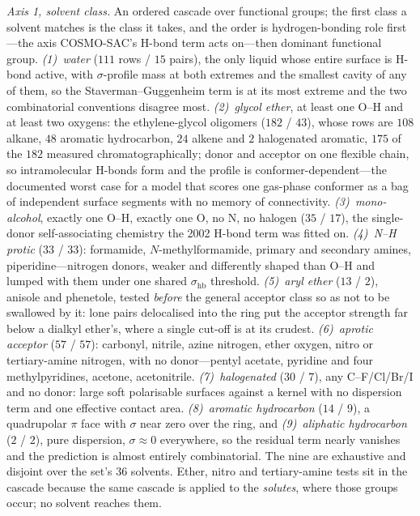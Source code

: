 \emph{Axis 1, solvent class.} An ordered cascade over functional groups; the first class a solvent
matches is the class it takes, and the order is hydrogen-bonding role first---the axis COSMO-SAC's
H-bond term acts on---then dominant functional group. \emph{(1)~water} ($111$ rows / $15$ pairs), the
only liquid whose entire surface is H-bond active, with $\sigma$-profile mass at both extremes and
the smallest cavity of any of them, so the Staverman--Guggenheim term is at its most extreme and the
two combinatorial conventions disagree most. \emph{(2)~glycol ether}, at least one O--H and at least
two oxygens: the ethylene-glycol oligomers ($182$ / $43$), whose rows are $108$ alkane, $48$
aromatic hydrocarbon, $24$ alkene and $2$ halogenated aromatic, $175$ of the $182$ measured
chromatographically; donor and acceptor on one flexible chain,
so intramolecular H-bonds form and the profile is conformer-dependent---the documented worst case for
a model that scores one gas-phase conformer as a bag of independent surface segments with no memory
of connectivity. \emph{(3)~mono-alcohol}, exactly one O--H, exactly one O, no N, no halogen ($35$ /
$17$), the single-donor self-associating chemistry the 2002 H-bond term was fitted on.
\emph{(4)~N--H protic} ($33$ / $33$): formamide, $N$-methylformamide, primary and secondary amines,
piperidine---nitrogen donors, weaker and differently shaped than O--H and lumped with them under one
shared $\sigma_{\mathrm{hb}}$ threshold. \emph{(5)~aryl ether} ($13$ / $2$), anisole and phenetole,
tested \emph{before} the general acceptor class so as not to be swallowed by it: lone pairs
delocalised into the ring put the acceptor strength far below a dialkyl ether's, where a single
cut-off is at its crudest. \emph{(6)~aprotic acceptor} ($57$ / $57$): carbonyl, nitrile, azine
nitrogen, ether oxygen, nitro or tertiary-amine nitrogen, with no donor---pentyl acetate, pyridine
and four methylpyridines, acetone, acetonitrile. \emph{(7)~halogenated} ($30$ / $7$), any
C--F/Cl/Br/I and no donor: large soft polarisable surfaces against a kernel with no dispersion term
and one effective contact area. \emph{(8)~aromatic hydrocarbon} ($14$ / $9$), a quadrupolar $\pi$
face with $\sigma$ near zero over the ring, and \emph{(9)~aliphatic hydrocarbon} ($2$ / $2$), pure
dispersion, $\sigma\approx0$ everywhere, so the residual term nearly vanishes and the prediction is
almost entirely combinatorial. The nine are exhaustive and disjoint over the set's $36$
solvents. Ether, nitro and tertiary-amine tests sit in the cascade because the same cascade is
applied to the \emph{solutes}, where those groups occur; no solvent reaches them.

